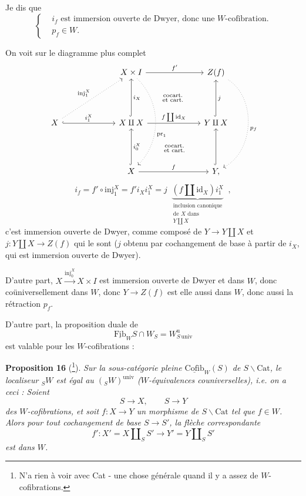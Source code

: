 \documentclass[11pt]{article}
\newcommand{\printedpage}[1]{{\reversemarginpar\marginnote{\raggedleft\scriptsize ed.~#1}}}
\newcommand{\msp}[1]{\marginpar{\raggedright\scriptsize ms.~#1}}
\begin{document}
Je dis que
\[
\left\{
\begin{aligned}
& i_f \text{ est immersion ouverte de Dwyer, donc une } W\text{-cofibration.} \\
& p_f \in W.
\end{aligned}
\right.
\]

\msp{page 230}
On voit sur le diagramme plus complet
\[
\begin{tikzcd}[column sep=6.5em, row sep=4.5em]
& X \times I \arrow[r, "f'"] \arrow[dd, dotted, bend left=45, "\mathrm{pr}_1"{pos=.60}] \arrow[dr, phantom, "\substack{\text{cocart.}\\ \text{et cart.}}"] & Z(f) \arrow[dd, dotted, bend left=60, "p_f"] \\
X \arrow[ur, dotted, "\mathrm{inj}_1^X"] \arrow[r, hook, "i_1^X"] & X \amalg X \arrow[u, hook, "i_X"'] \arrow[r, "f \coprod \mathrm{id}_X"] \arrow[dr, phantom, "\substack{\text{cocart.}\\ \text{et cart.}}"] & Y \amalg X \arrow[u, hook, "j"'] \\
& X \arrow[u, hook, "i_0^X"'] \arrow[r, "f"] & Y, \arrow[u, hook]
\end{tikzcd}
\]
\printedpage{147}
\[
i_f = f' \circ \mathrm{inj}_1^X = f' i_X i_1^X = j \ \ \underbrace{(f \amalg \mathrm{id}_X) i_1^X}_{\substack{\text{inclusion canonique}\\ \text{de } X \text{ dans}\\ Y \coprod X}} \ \ ,
\]
c'est immersion ouverte de Dwyer, comme composé de $Y \longrightarrow Y \amalg X$ et $j : Y \amalg X \longrightarrow Z(f)$ qui le sont ($j$ obtenu par cochangement de base à partir de $i_X$, qui est immersion ouverte de Dwyer).

D'autre part, $X \xrightarrow{\mathrm{inj}_0^X} X \times I$ est immersion ouverte de Dwyer et dans $W$, donc coüniversellement dans $W$, donc $Y \longrightarrow Z(f)$ est elle aussi dans $W$, donc aussi la rétraction $p_f$.

D'autre part, la proposition duale de
\[
\underline{\mathrm{Fib}}_W S \cap W_S = W^{\mathrm{u}}_{S\,\mathrm{univ}}
\]
est valable pour les $W$-cofibrations :

\msp{page 231}
\textbf{Proposition 16} (\footnote[125]{N'a rien à voir avec Cat - une chose générale quand il y a assez de $W$-cofibrations.}). \textit{Sur la sous-catégorie pleine $\underline{\mathrm{Cofib}}_W(S)$ de $S\backslash\mathrm{Cat}$, le localiseur ${}_SW$ est égal au $({}_SW)^{\mathrm{univ}}$ ($W$-équivalences couniverselles), i.e. on a ceci : Soient}
\[
S \longrightarrow X, \qquad S \longrightarrow Y
\]
\textit{des $W$-cofibrations, et soit $f : X \longrightarrow Y$ un morphisme de $S\backslash\mathrm{Cat}$ tel que $f \in W$. Alors pour tout cochangement de base $S \longrightarrow S'$, la flèche correspondante}
\[
f' : X' = X \amalg_S S' \longrightarrow Y' = Y \amalg_S S'
\]
\textit{est dans $W$.}
\end{document}
